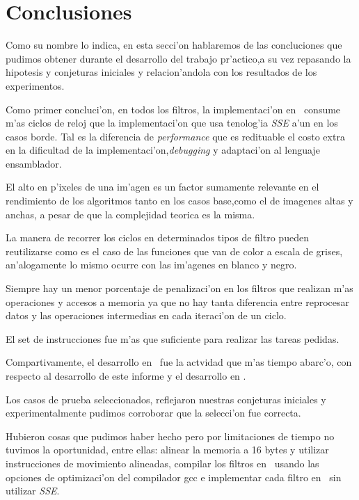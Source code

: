 \section{Conclusiones}
\label{sec:conclusiones}
Como su nombre lo indica, en esta secci'on hablaremos de las concluciones que pudimos obtener durante el desarrollo del 
trabajo pr'actico,a su vez repasando la hipotesis y conjeturas iniciales y relacion'andola con los resultados de los experimentos.

Como primer concluci'on, en todos los filtros, la implementaci'on en \C \ consume m'as ciclos de reloj que la implementaci'on que usa
tenolog'ia \textit{SSE} a'un en los casos borde. Tal es la diferencia de \textit{performance} que es redituable el costo extra en 
la dificultad de la implementaci'on,\textit{debugging} y adaptaci'on al lenguaje ensamblador.

El alto en p'ixeles de una im'agen es un factor sumamente relevante en el rendimiento de los algoritmos tanto en los casos base,como el de
imagenes altas y anchas, a pesar de que la complejidad teorica es la misma.

La manera de recorrer los ciclos en determinados tipos de filtro pueden reutilizarse como es el caso de las funciones que van de color 
a escala de grises, an'alogamente lo mismo ocurre con las im'agenes en blanco y negro.

Siempre hay un menor porcentaje de penalizaci'on en los filtros que realizan m'as operaciones y accesos a memoria ya que 
no hay tanta diferencia entre reprocesar datos y las operaciones intermedias en cada iteraci'on de un ciclo.

El set de instrucciones fue m'as que suficiente para realizar las tareas pedidas.

Compartivamente, el desarrollo en \ass \ fue la actvidad que m'as tiempo abarc'o, con respecto al desarrollo de este informe y
el desarrollo en \C.

Los casos de prueba seleccionados, reflejaron nuestras conjeturas iniciales y experimentalmente pudimos corroborar 
que la selecci'on fue correcta.

Hubieron cosas que pudimos haber hecho pero por limitaciones de tiempo no tuvimos la oportunidad, entre ellas: alinear la memoria a 16 bytes
y utilizar instrucciones de movimiento alineadas, compilar los filtros en \C \ usando las opciones de optimizaci'on del compilador
gcc e implementar cada filtro en \ass \ sin utilizar \textit{SSE}.  
